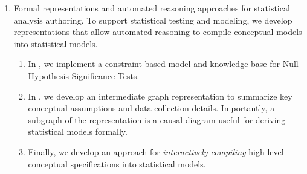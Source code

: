 \begin{enumerate}
    \item Formal representations and automated reasoning approaches for
    statistical analysis authoring. To support statistical testing and modeling,
    we develop representations that allow automated reasoning to compile
    conceptual models into statistical models. 
    \begin{enumerate}
        \item In \tea, we implement a constraint-based model and knowledge base
        for Null Hypothesis Significance Tests. 
        \item In \tisane, we develop an intermediate graph representation to
        summarize key conceptual assumptions and data collection details.
        Importantly, a subgraph of the representation is a causal diagram useful
        for deriving statistical models formally. 
        \item Finally, we develop an approach for \textit{interactively
        compiling} high-level conceptual specifications into statistical models. 
    \end{enumerate}
\end{enumerate}

